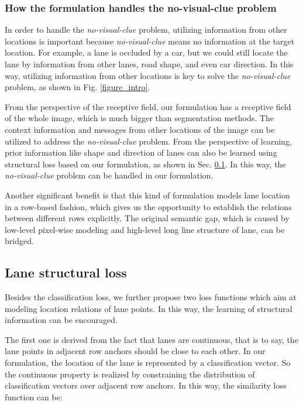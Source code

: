 \documentclass[runningheads]{llncs}
\begin{document}
\subsubsection{How the formulation handles the no-visual-clue problem}
In order to handle the \textit{no-visual-clue} problem, utilizing information from other locations is important because \textit{no-visual-clue} means no information at the target location. For example, a lane is occluded by a car, but we could still locate the lane by information from other lanes, road shape, and even car direction. In this way, utilizing information from other locations is key to solve the \textit{no-visual-clue} problem, as shown in Fig. \ref{figure_intro}.

From the perspective of the receptive field, our formulation has a receptive field of the whole image, which is much bigger than segmentation methods. The context information and messages from other locations of the image can be utilized to address the \textit{no-visual-clue} problem. 
From the perspective of learning, prior information like shape and direction of lanes can also be learned using structural loss based on our formulation, as shown in Sec. \ref{sec_loss}. In this way, the \textit{no-visual-clue} problem can be handled in our formulation.
 
Another significant benefit is that this kind of formulation models lane location in a row-based fashion, which gives us the opportunity to establish the relations between different rows explicitly. The original semantic gap, which is caused by low-level pixel-wise modeling and high-level long line structure of lane, can be bridged.



\subsection{Lane structural loss}
\label{sec_loss}


Besides the classification loss, we further propose two loss functions which aim at modeling location relations of lane points. In this way, the learning of structural information can be encouraged.

The first one is derived from the fact that lanes are continuous, that is to say, the lane points in adjacent row anchors should be close to each other. In our formulation, the location of the lane is represented by a classification vector. So the continuous property is realized by constraining the distribution of classification vectors over adjacent row anchors. In this way, the similarity loss function can be:
\end{document}
